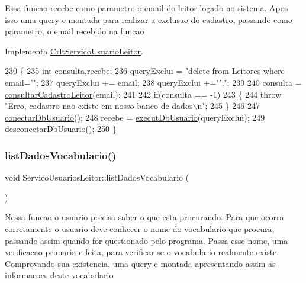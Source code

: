 Essa funcao recebe como parametro o email do leitor logado no sistema. Apos isso uma query e montada para realizar a exclusao do cadastro, passando como parametro, o email recebido na funcao

Implementa \mbox{\hyperlink{class_crlt_servico_usuario_leitor_a8318d7e7dadd648346aeda87fbcd5bca}{Crlt\+Servico\+Usuario\+Leitor}}.


\begin{DoxyCode}
230 \{
235     \textcolor{keywordtype}{int} consulta,recebe;
236     queryExclui = \textcolor{stringliteral}{"delete from Leitores where email='"};
237     queryExclui += email;
238     queryExclui +=\textcolor{stringliteral}{"';"};
239 
240     consulta = \mbox{\hyperlink{class_servico_usuarios_leitor_a8f34dddc0540f729a701d69f948ffb42}{consultarCadastroLeitor}}(email);
241 
242     \textcolor{keywordflow}{if}(consulta == -1)
243     \{
244       \textcolor{keywordflow}{throw} \textcolor{stringliteral}{"Erro, cadastro nao existe em nosso banco de dados\(\backslash\)n"};
245     \}
246 
247     \mbox{\hyperlink{comando_sql_8cpp_a4f89ddcbc4cf8f2587d89f72f8c7900d}{conectarDbUsuario}}();
248     recebe = \mbox{\hyperlink{comando_sql_8cpp_a748197580e7f9acdbf48c78de1f7924b}{executDbUsuario}}(queryExclui);
249     \mbox{\hyperlink{comando_sql_8cpp_a969be9911913568e30d4ae8963338bc3}{desconectarDbUsuario}}();
250 \}
\end{DoxyCode}
\mbox{\label{class_servico_usuarios_leitor_a4f533d318634c95d3f756a45c7613047}} 
\subsubsection{\texorpdfstring{list\+Dados\+Vocabulario()}{listDadosVocabulario()}}
{\footnotesize\ttfamily void Servico\+Usuarios\+Leitor\+::list\+Dados\+Vocabulario (\begin{DoxyParamCaption}{ }\end{DoxyParamCaption})\hspace{0.3cm}{\ttfamily [virtual]}}

Nessa funcao o usuario precisa saber o que esta procurando. Para que ocorra corretamente o usuario deve conhecer o nome do vocabulario que procura, passando assim quando for questionado pelo programa. Passa esse nome, uma verificacao primaria e feita, para verificar se o vocabulario realmente existe. Comprovando sua existencia, uma query e montada apresentando assim as informacoes deste vocabulario

